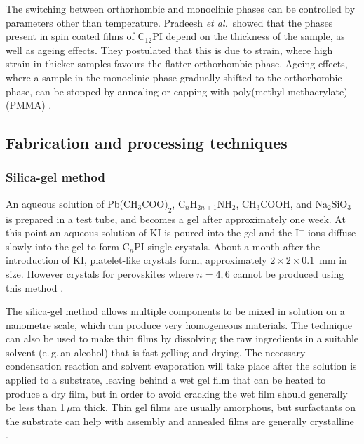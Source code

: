 The switching between orthorhombic and monoclinic phases can be controlled by parameters other than temperature. Pradeesh \textit{et al.}\ showed that the phases present in spin coated films of $\textrm{C}_{12}$PI depend on the thickness of the sample, as well as ageing effects. They postulated that this is due to strain, where high strain in thicker samples favours the flatter orthorhombic phase. Ageing effects, where a sample in the monoclinic phase gradually shifted to the orthorhombic phase, can be stopped by annealing or capping with poly(methyl methacrylate) (PMMA) \cite{Pradeesh2009}.

\subsection{Fabrication and processing techniques}
\subsubsection{Silica-gel method}
An aqueous solution of Pb($\textrm{CH}_3 \textrm{COO)}_2$, $\textrm{C}_n\textrm{H}_{2n+1}\textrm{NH}_2$, $\textrm{CH}_3$COOH, and $\textrm{Na}_2\textrm{SiO}_3$ is prepared in a test tube, and becomes a gel after approximately one week. At this point an aqueous solution of KI is poured into the gel and the $\textrm{I}^-$ ions diffuse slowly into the gel to form $\textrm{C}_n$PI single crystals. About a month after the introduction of KI, platelet-like crystals form, approximately $2\times 2\times 0.1$~mm in size. However crystals for perovskites where $n=4,6$ cannot be produced using this method \cite{Ishihara1990}.

The silica-gel method allows multiple components to be mixed in solution on a nanometre scale, which can produce very homogeneous materials. The technique can also be used to make thin films by dissolving the raw ingredients in a suitable solvent (e.\,g.\,an alcohol) that is fast gelling and drying. The necessary condensation reaction and solvent evaporation will take place after the solution is applied to a substrate, leaving behind a wet gel film that can be heated to produce a dry film, but in order to avoid cracking the wet film should generally be less than 1\,$\mu$m thick. Thin gel films are usually amorphous, but surfactants on the substrate can help with assembly and annealed films are generally crystalline \cite{Mitzi2001b}.

